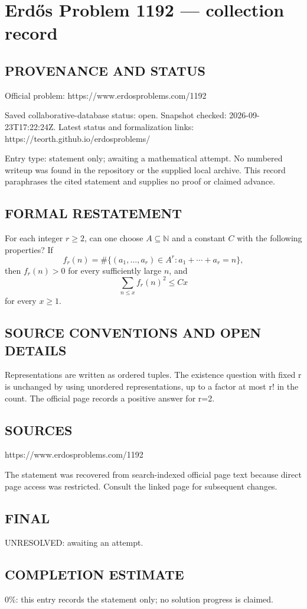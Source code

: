 \section*{Erd\H{o}s Problem 1192 --- collection record}

\subsection*{PROVENANCE AND STATUS}
Official problem: https://www.erdosproblems.com/1192

Saved collaborative-database status: open.
Snapshot checked: 2026-09-23T17:22:24Z.
Latest status and formalization links: https://teorth.github.io/erdosproblems/

Entry type: statement only; awaiting a mathematical attempt. No numbered writeup was found in the repository or the supplied local archive. This record paraphrases the cited statement and supplies no proof or claimed advance.

\subsection*{FORMAL RESTATEMENT}
For each integer $r\geq2$, can one choose $A\subseteq\mathbb N$ and a constant $C$ with the following properties? If
\[f_r(n)=\#\{(a_1,\ldots,a_r)\in A^r:a_1+\cdots+a_r=n\},\]
then $f_r(n)>0$ for every sufficiently large $n$, and
\[\sum_{n\leq x}f_r(n)^2\leq Cx\]
for every $x\geq1$.

\subsection*{SOURCE CONVENTIONS AND OPEN DETAILS}
Representations are written as ordered tuples. The existence question with fixed r is unchanged by using unordered representations, up to a factor at most r! in the count. The official page records a positive answer for r=2.

\subsection*{SOURCES}
https://www.erdosproblems.com/1192

The statement was recovered from search-indexed official page text because direct page access was restricted. Consult the linked page for subsequent changes.

\subsection*{FINAL}
UNRESOLVED: awaiting an attempt.

\subsection*{COMPLETION ESTIMATE}
$0\%$: this entry records the statement only; no solution progress is claimed.
